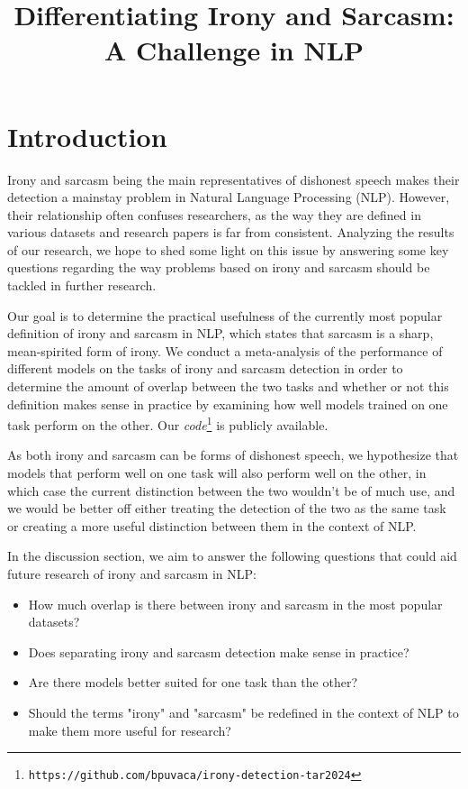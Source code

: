 \documentclass[10pt, a4paper]{article}
\title{Differentiating Irony and Sarcasm: A Challenge in NLP}
\begin{document}
\maketitleabstract

   


\section{Introduction}

Irony and sarcasm being the main representatives of dishonest speech makes their detection a mainstay problem in Natural Language 
Processing (NLP). However,
their relationship often confuses researchers, as the way they are defined in various datasets and research papers is far from
consistent. Analyzing the results of our research, we hope to shed some light on this issue by answering some key questions regarding
the way problems based on irony and sarcasm should be tackled in further research.

Our goal is to determine the practical usefulness of the currently most popular definition of irony and sarcasm in NLP, which
states that sarcasm is a sharp, mean-spirited form of irony. We conduct a meta-analysis of the performance of different
models on the tasks of irony and sarcasm detection in order to determine the amount of overlap between the two tasks and
whether or not this definition makes sense in practice by examining how well models trained on one task perform on the other.
Our \emph{code}\footnote{\scriptsize\texttt{https://github.com/bpuvaca/irony-detection-tar2024}} is publicly available.

As both irony and sarcasm 
can be forms of dishonest speech, 
we hypothesize that models that perform well on one task will also perform
well on the other, in which case the current distinction between the two wouldn't be of much use, and we would be better off
either treating the detection of the two as the same task or creating a more useful distinction between them in the context
of NLP.

In the discussion section, we aim to answer the following questions that could aid future research of irony
and sarcasm in NLP:

\begin{itemize}
   \item How much overlap is there between irony and sarcasm in the most popular datasets?
   \item Does separating irony and sarcasm detection make sense in practice?
   \item Are there models better suited for one task than the other?
   \item Should the terms "irony" and "sarcasm" be redefined in the context of NLP to make them more useful for research?
\end{itemize}
\end{document}
